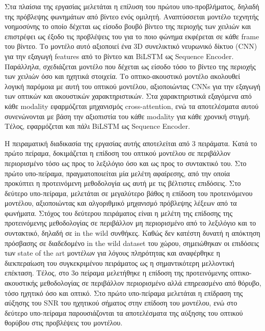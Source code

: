 Στα πλαίσια της εργασίας μελετάται η επίλυση του πρώτου υπο-προβλήματος, δηλαδή της πρόβλεψης φωνημάτων από βίντεο ενός ομιλητή. Αναπτύσσεται μοντέλο τεχνητής νοημοσύνης το οποίο δέχεται ως είσοδο βουβό βίντεο της περιοχής των χειλιών και επιστρέφει ως έξοδο τις προβλέψεις του για το ποιο φώνημα εκφέρεται σε κάθε frame του βίντεο. Το μοντέλο αυτό αξιοποιεί ένα 3D συνελικτικό νευρωνικό δίκτυο (CNN) για την εξαγωγή features από το βίντεο και BiLSTM ως Sequence Encoder. Παράλληλα, σχεδιάζεται μοντέλο που δέχεται ως είσοδο τόσο το βίντεο της περιοχής των χειλιών όσο και ηχητικά στοιχεία. Το οπτικο-ακουστικό μοντέλο ακολουθεί λογική παρόμοια με αυτή του οπτικού μοντέλου, αξιοποιώντας CNNs για την εξαγωγή των οπτικών και ακουστικών χαρακτηριστικών. Στα χαρακτηριστικά εξαγόμενα από κάθε modality εφαρμόζεται μηχανισμός cross-attention, ενώ τα αποτελέσματα αυτού συνενώνονται με βάση την αξιοπιστία του κάθε modality για κάθε χρονική στιγμή. Τέλος, εφαρμόζεται και πάλι BiLSTM ως Sequence Encoder.

Η πειραματική διαδικασία της εργασίας αυτής αποτελείται από 3 πειράματα. Κατά το πρώτο πείραμα, δοκιμάζεται η επίδοση του οπτικού μοντέλου σε περιβάλλον περιορισμένο τόσο ως προς το λεξιλόγιο όσο και ως προς το συντακτικό του. Στο πρώτο υπο-πείραμα, πραγματοποιείται μία μελέτη αφαίρεσης, από την οποία προκύπτει η προτεινόμενη μεθοδολογία ως αυτή με τις βέλτιστες επιδόσεις. Στο δεύτερο υπο-πείραμα, μελετάται σε μεγαλύτερο βάθος η επίδοση του προτεινόμενου μοντέλου, αξιοποιώντας και αλγοριθμικό μηχανισμό πρόβλεψης λέξεων από τα φωνήματα. Στόχος του δεύτερου πειράματος είναι η μελέτη της επίδοσης της προτεινόμενης μεθοδολογίας σε περιβάλλον μη περιορισμένο από το λεξιλόγιο και το συντακτικό, δηλαδή σε in the wild συνθήκες. Καθώς δεν κατέστη δυνατή η απόκτηση πρόσβασης σε διαδεδομένο in the wild dataset του χώρου, σημειώθηκαν οι επιδόσεις των state of the art μοντέλων για λόγους πληρότητας και αναφέρθηκε η διεκπεραίωση του συγκεκριμένου πειράματος ως η σημαντικότερη μελλοντική επέκταση. Τέλος, στο 3ο πείραμα μελετήθηκε η επίδοση της προτεινόμενης οπτικο-ακουστικής μεθοδολογίας σε περιβάλλον περιορισμένο αλλά επηρεασμένο από θόρυβο, τόσο ηχητικό όσο και οπτικό. Στο πρώτο υπο-πείραμα μελετάται η επίδραση της αύξησης του SNR του ηχητικού σήματος στην επίδοση του μοντέλου, ενώ στο δεύτερο υπο-πείραμα παρουσιάζονται τα αποτελέσματα της αύξησης του οπτικού θορύβου στις προβλέψεις του μοντέλου.